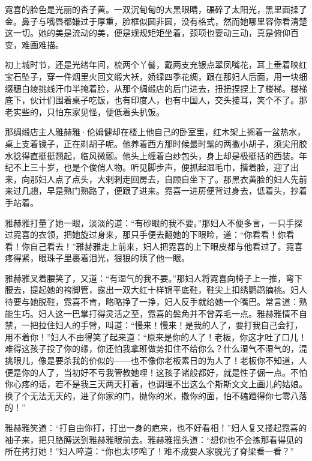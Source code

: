 \par 霓喜的脸色是光丽的杏子黄。一双沉甸甸的大黑眼睛，碾碎了太阳光，黑里面揉了金。鼻子与嘴唇都嫌过于厚重，脸框似圆非圆，没有格式，然而她哪里容你看清楚这一切。她的美是流动的美，便是规规矩矩坐着，颈项也要动三动，真是俯仰百变，难画难描。
\par 初上城时节，还是光绪年间，梳两个丫髻，戴两支充银点翠凤嘴花，耳上垂着映红宝石坠子，穿一件烟里火回文缎大袄，娇绿四季花绸，跟在那妇人后面，用一块细缀穗白绫挑线汗巾半掩着脸，从那个绸缎店的后门进去，扭扭捏捏上了楼梯。楼梯底下，伙计们围着桌子吃饭，也有印度人，也有中国人，交头接耳，笑个不了。那老实些的，只怕东家见怪，便低着头扒饭。
\par 那绸缎店主人雅赫雅·伦姆健却在楼上他自己的卧室里，红木架上搁着一盆热水，桌上支着镜子，正在剃胡子呢。他养着西方那时候最时髦的两撇小胡子，须尖用胶水捻得直挺挺翘起，临风微颤。他头上缠着白纱包头，身上却是极挺括的西装。年纪不上三十岁，也是个俊俏人物。听见脚步声，便抓起湿毛巾，揩着脸，迎了出来，向那妇人点了点头，大剌剌走回房去，自顾自坐下了。那黑衣黄脸的妇人先前来过几趟，早是熟门熟路了，便跟了进来。霓喜一进房便背过身去，低着头，抄着手站着。
\par 雅赫雅打量了她一眼，淡淡的道：“有砂眼的我不要。”那妇人不便多言，一只手探过霓喜的衣领，把她旋过身来，那只手便去翻她的下眼睑，道：“你看看！你看看！你自己看去！”雅赫雅走上前来，妇人把霓喜的上下眼皮都与他看过了。霓喜疼得紧，眼珠子里裹着泪光，狠狠的眱了他一眼。
\par 雅赫雅叉着腰笑了，又道：“有湿气的我不要。”那妇人将霓喜向椅子上一推，弯下腰去，提起她的袴脚管，露出一双大红十样锦平底鞋，鞋尖上扣绣鹦鹉摘桃。妇人待要与她脱鞋，霓喜不肯，略略挣了一挣，妇人反手就给她一个嘴巴。常言道：熟能生巧。妇人这一巴掌打得灵活之至，霓喜的鬓角并不曾弄毛一点。雅赫雅情不自禁，一把拉住妇人的手臂，叫道：“慢来！慢来！是我的人了，要打我自己会打，用不着你！”妇人不由得笑了起来道：“原来是你的人了！老板，你这才吐了口儿！难得这孩子投了你的缘，你还怕我拿班做势扣住不给你么？什么湿气不湿气的，混挑眼儿，像是要杀我的价似的——也不像你老板素日的为人了！老板你不知道，人便是你的人了，当初好不亏我管教她哩！这孩子诸般都好，就是性子倔一点。不怕你心疼的话，若不是我三天两天打着，也调理不出这么个斯斯文文上画儿的姑娘。换了个无法无天的，进了你家的门，抛你的米，撒你的面，怕不磕蹬得你七零八落的！”
\par 雅赫雅笑道：“打自由你打，打出一身的疤来，也不好看相！”妇人复又搂起霓喜的袖子来，把只胳膊送到雅赫雅眼前去。雅赫雅摇头道：“想你也不会拣那看得见的所在拷打她！”妇人啐道：“你也太啰唣了！难不成要人家脱光了脊梁看一看？”
